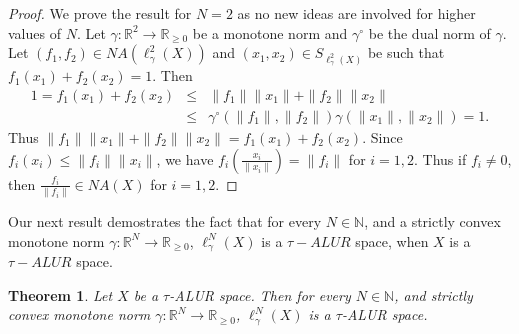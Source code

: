 \documentclass[11pt]{amsart}
\newtheorem{thm}{Theorem}[section]
\newcommand{\ra}{\rightarrow}
\newcommand{\ga}{\gamma}
\newcommand{\mb}{\mathbb}
\newcommand{\cc}{\circ}
\newcommand{\beqa}{\begin{eqnarray*}}
\newcommand{\eeqa}{\end{eqnarray*}}
\begin{document}
\begin{proof}
We prove the result for $N=2$ as no new ideas are involved for higher values of $N$. Let $\ga:\mb{R}^2\ra\mb{R}_{\geq0}$ be a monotone norm and $\ga^\cc$ be the dual norm of $\ga$. Let  $(f_1,f_2)\in NA(\ell_\ga^2(X))$ and $(x_1,x_2)\in S_{\ell_\ga^2(X)}$ be such that $f_1(x_1)+f_2(x_2)=1$. Then
\beqa
1=f_1(x_1)+f_2(x_2)&\leq&\|f_1\|\|x_1\|+\|f_2\|\|x_2\|\\
&\leq&\ga^\cc(\|f_1\|,\|f_2\|)\ga(\|x_1\|,\|x_2\|)=1.
\eeqa
Thus $\|f_1\|\|x_1\|+\|f_2\|\|x_2\|=f_1(x_1)+f_2(x_2)$. Since $f_i(x_i)\leq\|f_i\|\|x_i\|$, we have $f_i(\frac{x_i}{\|x_i\|})=\|f_i\|$ for $i=1,2$. Thus if $f_i\neq0$, then $\frac{f_i}{\|f_i\|}\in NA(X)$ for $i=1,2$. 
\end{proof}
Our next result demostrates the fact that for every $N\in\mb{N}$, and a strictly convex monotone norm $\ga:\mb{R}^N\ra\mb{R}_{\geq0}$, $\ell_\ga^N(X)$ is a $\tau-ALUR$ space, when $X$ is a $\tau-ALUR$ space.
\begin{thm}\label{T9}
Let $X$ be a $\tau$-ALUR space. Then for every $N\in\mb{N}$, and strictly convex  monotone norm $\ga:\mb{R}^N\ra\mb{R}_{\geq0}$, $\ell_\ga^N(X)$ is a $\tau$-ALUR space.
\end{thm}
\end{document}
